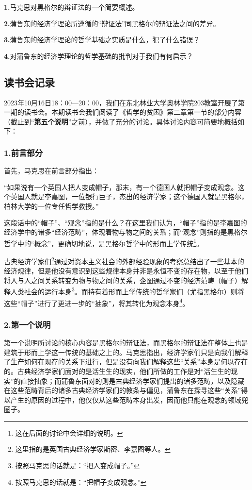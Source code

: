 \documentclass[a4paper,twoside,12pt,AutoFakeBold]{ctexart}
\begin{document}
\textbf{1.}马克思对黑格尔的辩证法的一个简要概述。

\textbf{2.}蒲鲁东的经济学理论所遵循的“辩证法”同黑格尔的辩证法之间的差异。

\textbf{3.}蒲鲁东的经济学理论的哲学基础之实质是什么，犯了什么错误？

\textbf{4.}对蒲鲁东的经济学理论的哲学基础的批判对于我们有何启示？

\subsection{读书会记录}
2023年10月16日18：00—20：00，我们在东北林业大学奥林学院203教室开展了第一期的读书会。本期读书会我们阅读了《哲学的贫困》第二章第一节的部分内容（截止到“\textbf{第五个说明}”之前），并做了充分的讨论。具体讨论内容可简要地概括如下：

\subsubsection{1.前言部分}\label{sec:3}

首先，马克思在前言部分指出：
\begin{adjustwidth}{2em}{2em}
\qquad\fangsong
“如果说有一个英国人把人变成帽子，那末，有一个德国人就把帽子变成观念。这个英国人就是李嘉图，一位银行巨子，杰出的经济学家；这个德国人就是黑格尔，柏林大学的一位专任哲学教授。”
\end{adjustwidth}

这段话中的“帽子”、“观念”指的是什么？在这里我们认为，“帽子”指的是李嘉图的经济学中的诸多“经济范畴”，体现着物与物之间的关系；而“观念”则指的是黑格尔哲学中的“概念”，更确切地说，是黑格尔哲学中的形而上学传统\footnote{这在后面的讨论中会详细的说明。}。

古典经济学家们\footnote{这里指的是英国古典经济学家斯密、李嘉图等人。}通过对资本主义社会的外部经验现象的考察总结出了一些基本的经济规律，但是他没有意识到这些规律本身并非是永恒不变的存在物，以至于他们将人与人之间关系转变为物与物之间的关系，企图通过不变的经济范畴（帽子）解释人类社会的运行本身\footnote{按照马克思的话就是：“把人变成帽子。”}。而持有着形而上学传统的哲学家们（尤指黑格尔）则将这些“帽子”进行了更进一步的“抽象”，将其转化为观念本身\footnote{按照马克思的话就是：“把帽子变成观念。”}。

\subsubsection{2.第一个说明}

第一个说明所讨论的核心内容是黑格尔的辩证法，而黑格尔的辩证法在整体上也是建筑于形而上学这一传统的基础之上的。马克思指出，经济学家们只是向我们解释了生产如何在现存的关系下进行，但是没有向我们解释这些“关系”本身是何以存在的。古典经济学家们面对的是活生生的现实，他们所做的工作是对“活生生的现实”的直接抽象；而蒲鲁东面对的则是古典经济学家们提出的诸多范畴，以及隐藏在这些范畴背后的诸多古典经济学家们的教条与偏见，蒲鲁东在探寻这些“关系”得以产生的原因的过程中，他仅仅从这些范畴本身出发，因而他只能在观念的领域兜圈子。
\end{document}
